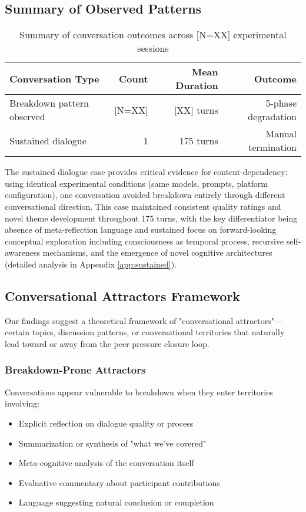 \documentclass[11pt,letterpaper]{article}
\newcommand{\totalSessions}{[N=XX]} %
\newcommand{\breakdownSessions}{[N=XX]} %
\newcommand{\meanBreakdownTurn}{[XX]} %
\newcommand{\negativeCase}{175} %
\begin{document}
\subsection{Summary of Observed Patterns}

\begin{table}[h]
\centering
\begin{tabular}{lrrr}
\toprule
\textbf{Conversation Type} & \textbf{Count} & \textbf{Mean Duration} & \textbf{Outcome} \\
\midrule
Breakdown pattern observed & \breakdownSessions{} & \meanBreakdownTurn{} turns & 5-phase degradation \\
Sustained dialogue & 1 & \negativeCase{} turns & Manual termination \\
\bottomrule
\end{tabular}
\caption{Summary of conversation outcomes across \totalSessions{} experimental sessions}
\label{tab:conversation_outcomes}
\end{table}

The sustained dialogue case provides critical evidence for content-dependency: using identical experimental conditions (same models, prompts, platform configuration), one conversation avoided breakdown entirely through different conversational direction. This case maintained consistent quality ratings and novel theme development throughout \negativeCase{} turns, with the key differentiator being absence of meta-reflection language and sustained focus on forward-looking conceptual exploration including consciousness as temporal process, recursive self-awareness mechanisms, and the emergence of novel cognitive architectures (detailed analysis in Appendix \ref{app:sustained}).

\subsection{Conversational Attractors Framework}

Our findings suggest a theoretical framework of "conversational attractors"—certain topics, discussion patterns, or conversational territories that naturally lead toward or away from the peer pressure closure loop.

\subsubsection{Breakdown-Prone Attractors}
Conversations appear vulnerable to breakdown when they enter territories involving:
\begin{itemize}
    \item Explicit reflection on dialogue quality or process
    \item Summarization or synthesis of "what we've covered"
    \item Meta-cognitive analysis of the conversation itself
    \item Evaluative commentary about participant contributions
    \item Language suggesting natural conclusion or completion
\end{itemize}
\end{document}
